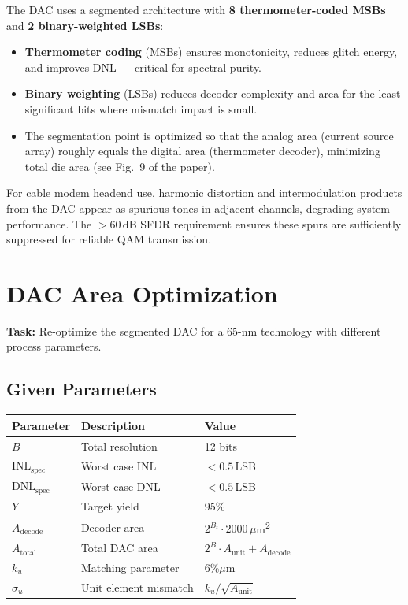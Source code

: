 \documentclass{article}
\begin{document}
The DAC uses a segmented architecture with \textbf{8 thermometer-coded MSBs} and \textbf{2 binary-weighted LSBs}:
\begin{itemize}
    \item \textbf{Thermometer coding} (MSBs) ensures monotonicity, reduces glitch energy, and improves DNL --- critical for spectral purity.
    \item \textbf{Binary weighting} (LSBs) reduces decoder complexity and area for the least significant bits where mismatch impact is small.
    \item The segmentation point is optimized so that the analog area (current source array) roughly equals the digital area (thermometer decoder), minimizing total die area (see Fig.~9 of the paper).
\end{itemize}

For cable modem headend use, harmonic distortion and intermodulation products from the DAC appear as spurious tones in adjacent channels, degrading system performance. The $>60$\,dB SFDR requirement ensures these spurs are sufficiently suppressed for reliable QAM transmission.

\section{DAC Area Optimization}

\textbf{Task:} Re-optimize the segmented DAC for a 65-nm technology with different process parameters.

\subsection{Given Parameters}

\begin{table}[H]
\centering
\begin{tabular}{@{}lll@{}}
\toprule
Parameter & Description & Value \\
\midrule
$B$       & Total resolution & 12 bits \\
$\text{INL}_\text{spec}$ & Worst case INL & $< 0.5$\,LSB \\
$\text{DNL}_\text{spec}$ & Worst case DNL & $< 0.5$\,LSB \\
$Y$       & Target yield & 95\% \\
$A_\text{decode}$ & Decoder area & $2^{B_t} \cdot 2000$\,$\mu$m\textsuperscript{2} \\
$A_\text{total}$ & Total DAC area & $2^B \cdot A_\text{unit} + A_\text{decode}$ \\
$k_u$     & Matching parameter & 6\%$\mu$m \\
$\sigma_u$ & Unit element mismatch & $k_u / \sqrt{A_\text{unit}}$ \\
\bottomrule
\end{tabular}
\end{table}
\end{document}
